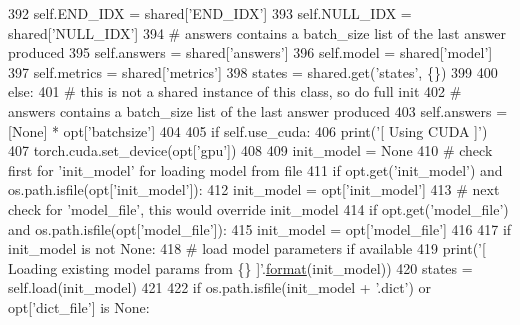 \begin{DoxyCode}
392             self.END\_IDX = shared[\textcolor{stringliteral}{'END\_IDX'}]
393             self.NULL\_IDX = shared[\textcolor{stringliteral}{'NULL\_IDX'}]
394             \textcolor{comment}{# answers contains a batch\_size list of the last answer produced}
395             self.answers = shared[\textcolor{stringliteral}{'answers'}]
396             self.model = shared[\textcolor{stringliteral}{'model'}]
397             self.metrics = shared[\textcolor{stringliteral}{'metrics'}]
398             states = shared.get(\textcolor{stringliteral}{'states'}, \{\})
399 
400         \textcolor{keywordflow}{else}:
401             \textcolor{comment}{# this is not a shared instance of this class, so do full init}
402             \textcolor{comment}{# answers contains a batch\_size list of the last answer produced}
403             self.answers = [\textcolor{keywordtype}{None}] * opt[\textcolor{stringliteral}{'batchsize'}]
404 
405             \textcolor{keywordflow}{if} self.use\_cuda:
406                 print(\textcolor{stringliteral}{'[ Using CUDA ]'})
407                 torch.cuda.set\_device(opt[\textcolor{stringliteral}{'gpu'}])
408 
409             init\_model = \textcolor{keywordtype}{None}
410             \textcolor{comment}{# check first for 'init\_model' for loading model from file}
411             \textcolor{keywordflow}{if} opt.get(\textcolor{stringliteral}{'init\_model'}) \textcolor{keywordflow}{and} os.path.isfile(opt[\textcolor{stringliteral}{'init\_model'}]):
412                 init\_model = opt[\textcolor{stringliteral}{'init\_model'}]
413             \textcolor{comment}{# next check for 'model\_file', this would override init\_model}
414             \textcolor{keywordflow}{if} opt.get(\textcolor{stringliteral}{'model\_file'}) \textcolor{keywordflow}{and} os.path.isfile(opt[\textcolor{stringliteral}{'model\_file'}]):
415                 init\_model = opt[\textcolor{stringliteral}{'model\_file'}]
416 
417             \textcolor{keywordflow}{if} init\_model \textcolor{keywordflow}{is} \textcolor{keywordflow}{not} \textcolor{keywordtype}{None}:
418                 \textcolor{comment}{# load model parameters if available}
419                 print(\textcolor{stringliteral}{'[ Loading existing model params from \{\} ]'}.\hyperlink{namespaceparlai_1_1chat__service_1_1services_1_1messenger_1_1shared__utils_a32e2e2022b824fbaf80c747160b52a76}{format}(init\_model))
420                 states = self.load(init\_model)
421 
422                 \textcolor{keywordflow}{if} os.path.isfile(init\_model + \textcolor{stringliteral}{'.dict'}) \textcolor{keywordflow}{or} opt[\textcolor{stringliteral}{'dict\_file'}] \textcolor{keywordflow}{is} \textcolor{keywordtype}{None}:

\end{DoxyCode}

